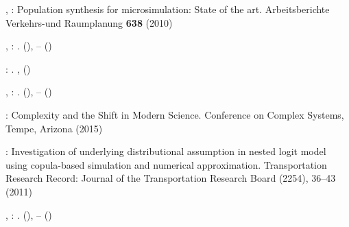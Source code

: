 \documentclass{article}
\begin{document}
\begin{thebibliography}{59}
\begin{botherref}
,
:
Population synthesis for microsimulation: State of the art.
Arbeitsberichte Verkehrs-und Raumplanung
\textbf{638}
(2010)
\end{botherref}
\endbibitem

\begin{barticle}
,
:
.
(),
--
()
\end{barticle}
\endbibitem

\begin{bbook}
:
.
,
()
\end{bbook}
\endbibitem

\begin{barticle}
,
:
.
(),
--
()
\end{barticle}
\endbibitem

\begin{botherref}
:
Complexity and the Shift in Modern Science.
Conference on Complex Systems, Tempe, Arizona
(2015)
\end{botherref}
\endbibitem

\begin{botherref}
:
Investigation of underlying distributional assumption in nested logit model
  using copula-based simulation and numerical approximation.
Transportation Research Record: Journal of the Transportation Research Board
(2254),
36--43
(2011)
\end{botherref}
\endbibitem

\begin{barticle}
,
:
.
(),
--
()
\end{barticle}
\endbibitem


\end{thebibliography}
\end{document}
